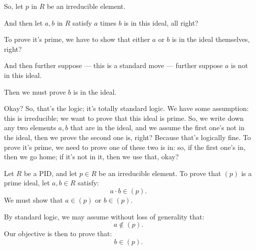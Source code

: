 \begin{proofWrapper}
\begin{speech}[00:47:07 - 00:48:42]
So, let $p$ in $R$  be an irreducible element. 

And then let $a, b$ in $R$  satisfy $a$ times $b$ is in this ideal, all right? 

To prove it's prime, we have to show that either $a$ or $b$ is in the ideal themselves, right?

And then further suppose --- this is a standard move --- further suppose  $a$ is not in this ideal. 

Then we must prove  $b$ is in the ideal. 

Okay? So, that's the logic; it's totally standard logic. We have some assumption: this is irreducible; we want to prove that this ideal is prime. So, we write down any two elements $a, b$ that are in the ideal, and we assume the first one's not in the ideal, then we prove the second one is, right? Because that's logically fine. To prove it's prime, we need to prove one of these two is in: so, if the first one's in, then we go home; if it's not in it, then we use that, okay?
\end{speech}

\begin{content}
Let $R$ be a PID, and let $p \in R$ be an irreducible element. To prove that $(p)$ is a prime ideal, let $a, b \in R$ satisfy:
\begin{equation}\label{eq:part3-ab-in-p}
a \cdot b \in (p).
\end{equation}
We must show that $a \in (p)$ or $b \in (p)$.

By standard logic, we may assume without loss of generality that:
\begin{equation}\label{eq:part3-a-not-in-p}
a \notin (p).
\end{equation}
Our objective is then to prove that:
\begin{equation}\label{eq:part3-goal-b-in-p}
b \in (p).
\end{equation}
\end{content}


\end{proofWrapper}
